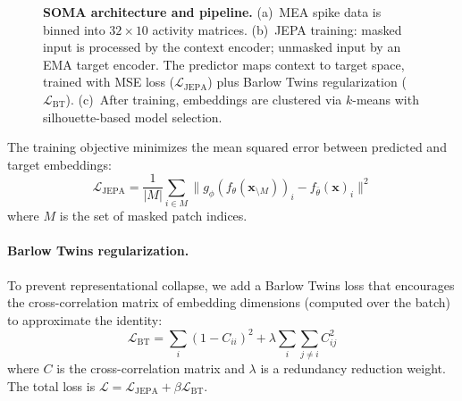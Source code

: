 \documentclass{article}
\begin{document}
\begin{figure}[t]
\caption{\textbf{SOMA architecture and pipeline.} (a)~MEA spike data is binned into $32 \times 10$ activity matrices. (b)~JEPA training: masked input is processed by the context encoder; unmasked input by an EMA target encoder. The predictor maps context to target space, trained with MSE loss ($\mathcal{L}_{\text{JEPA}}$) plus Barlow Twins regularization ($\mathcal{L}_{\text{BT}}$). (c)~After training, embeddings are clustered via $k$-means with silhouette-based model selection.}
\label{fig:architecture}
\end{figure}

The training objective minimizes the mean squared error between predicted and target embeddings:
\begin{equation}
    \mathcal{L}_{\text{JEPA}} = \frac{1}{|M|} \sum_{i \in M} \| g_\phi(f_\theta(\mathbf{x}_{\setminus M}))_i - f_{\bar{\theta}}(\mathbf{x})_i \|^2
\end{equation}
where $M$ is the set of masked patch indices.

\paragraph{Barlow Twins regularization.} To prevent representational collapse, we add a Barlow Twins loss \citep{zbontar2021barlow} that encourages the cross-correlation matrix of embedding dimensions (computed over the batch) to approximate the identity:
\begin{equation}
    \mathcal{L}_{\text{BT}} = \sum_i (1 - C_{ii})^2 + \lambda \sum_i \sum_{j \neq i} C_{ij}^2
\end{equation}
where $C$ is the cross-correlation matrix and $\lambda$ is a redundancy reduction weight. The total loss is $\mathcal{L} = \mathcal{L}_{\text{JEPA}} + \beta \mathcal{L}_{\text{BT}}$.
\end{document}

